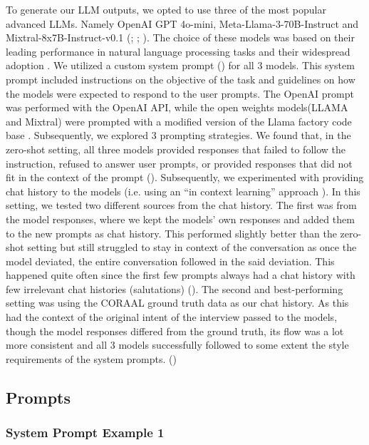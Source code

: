 To generate our LLM outputs, we opted to use three of the most popular advanced LLMs. Namely OpenAI GPT 4o-mini, Meta-Llama-3-70B-Instruct and Mixtral-8x7B-Instruct-v0.1 (\citealp{brown2020language}; \citealp{llama3modelcard}; \citealp{jiang2024mixtral}). The choice of these models was based on their leading performance in natural language processing tasks and their widespread adoption \cite{chiang2024chatbot}. We utilized a custom system prompt () for all 3 models. This system prompt included instructions on the objective of the task and guidelines on how the models were expected to respond to the user prompts. The OpenAI prompt was performed with the OpenAI API, while the open weights models(LLAMA and Mixtral) were prompted with a modified version of the Llama factory code base \cite{zheng2024llamafactory}. Subsequently, we explored 3 prompting strategies. We found that, in the zero-shot setting, all three models provided responses that failed to follow the instruction, refused to answer user prompts, or provided responses that did not fit in the context of the prompt (). Subsequently, we experimented with providing chat history to the models (i.e. using an ``in context learning'' approach \cite{brown2020language}).  In this setting, we tested two different sources from the chat history. The first was from the model responses, where we kept the models' own responses and added them to the new prompts as chat history. This performed slightly better than the zero-shot setting but still struggled to stay in context of the conversation as once the model deviated, the entire conversation followed in the said deviation. This happened quite often since the first few prompts always had a chat history with few irrelevant chat histories (salutations) (). The second and best-performing setting was using the CORAAL ground truth data as our chat history. As this had the context of the original intent of the interview passed to the models, though the model responses differed from the ground truth, its flow was a lot more consistent and all 3 models successfully followed to some extent the style requirements of the system prompts. ()

\newpage
\subsection{Prompts} \label{apdx:prompts}
\subsubsection{System Prompt Example 1}
\noindent{}

